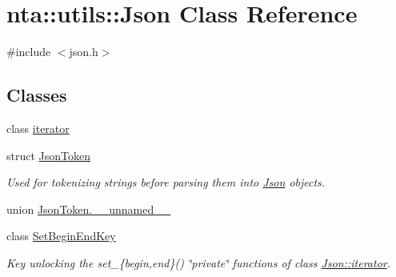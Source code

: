 \hypertarget{classnta_1_1utils_1_1Json}{}\section{nta\+:\+:utils\+:\+:Json Class Reference}
\label{classnta_1_1utils_1_1Json}


{\ttfamily \#include $<$json.\+h$>$}

\subsection*{Classes}
\begin{DoxyCompactItemize}
\item 
class \hyperlink{classnta_1_1utils_1_1Json_1_1iterator}{iterator}
\item 
struct \hyperlink{structnta_1_1utils_1_1Json_1_1JsonToken}{Json\+Token}
\begin{DoxyCompactList}\small\item\em Used for tokenizing strings before parsing them into \hyperlink{classnta_1_1utils_1_1Json}{Json} objects. \end{DoxyCompactList}\item 
union \hyperlink{classnta_1_1utils_1_1Json_d6/d05/unionnta_1_1utils_1_1Json_1_1JsonToken_8____unnamed____}{Json\+Token.\+\_\+\+\_\+unnamed\+\_\+\+\_\+}
\item 
class \hyperlink{classnta_1_1utils_1_1Json_1_1SetBeginEndKey}{Set\+Begin\+End\+Key}
\begin{DoxyCompactList}\small\item\em Key unlocking the set\+\_\+\{begin,end\}() \char`\"{}private\char`\"{} functions of class \hyperlink{classnta_1_1utils_1_1Json_1_1iterator}{Json\+::iterator}. \end{DoxyCompactList}\end{DoxyCompactItemize}
